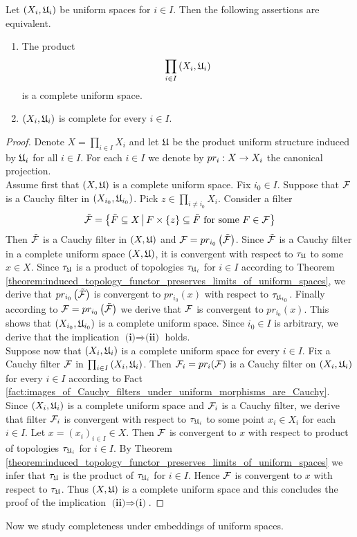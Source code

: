 \begin{theorem}\label{theorem:completeness_is_a_product_property}
Let $\left(X_i,{\mathfrak U}_i\right)$ be uniform spaces for $i \in I$. Then the following assertions are equivalent.
\begin{enumerate}[label=\emph{\textbf{(\roman*)}}, leftmargin=*]
\item The product
$$\prod_{i\in I}\left(X_i,{\mathfrak U}_i\right)$$
is a complete uniform space.
\item $\left(X_i,{\mathfrak U}_i\right)$ is complete for every $i\in I$.
\end{enumerate}
\end{theorem}
\begin{proof}
Denote $X = \prod_{i\in I}X_i$ and let ${\mathfrak U}$ be the product uniform structure induced by ${\mathfrak U}_i$ for all $i\in I$. For each $i\in I$ we denote by $pr_i:X\rightarrow X_i$ the canonical projection.\\
Assume first that $(X,{\mathfrak U})$ is a complete uniform space. Fix $i_0 \in I$. Suppose that ${\mathcal F}$ is a Cauchy filter in $(X_{i_0},{\mathfrak U}_{i_0})$. Pick $z \in \prod_{i\neq i_0}X_i$. Consider a filter 
$$\tilde{{\mathcal F}} = \big\{\tilde{F}\subseteq X\,\big|\,F\times \{z\} \subseteq \tilde{F}\mbox{ for some }F\in {\mathcal F}\big\}$$
Then $\tilde{{\mathcal F}}$ is a Cauchy filter in $(X,{\mathfrak U})$ and ${\mathcal F} = pr_{i_0}\left(\tilde{{\mathcal F}}\right)$. Since $\tilde{{\mathcal F}}$ is a Cauchy filter in a complete uniform space $(X,{\mathfrak U})$, it is convergent with respect to $\tau_{{\mathfrak U}}$ to some $x \in X$. Since $\tau_{{\mathfrak U}}$ is a product of topologies $\tau_{{\mathfrak U}_i}$ for $i \in I$ according to Theorem \ref{theorem:induced_topology_functor_preserves_limits_of_uniform_spaces}, we derive that $pr_{i_0}\left(\tilde{{\mathcal F}}\right)$ is convergent to $pr_{i_0}(x)$ with respect to $\tau_{{\mathfrak U}_{i_0}}$. Finally according to ${\mathcal F} = pr_{i_0}\left(\tilde{{\mathcal F}}\right)$ we derive that ${\mathcal F}$ is convergent to $pr_{i_0}(x)$. This shows that $(X_{i_0},{\mathfrak U}_{i_0})$ is a complete uniform space. Since $i_0 \in I$ is arbitrary, we derive that the implication $\textbf{(i)}\Rightarrow \textbf{(ii)}$ holds.
\\
Suppose now that $\left(X_i,{\mathfrak U}_i\right)$ is a complete uniform space for every $i\in I$. Fix a Cauchy filter ${\mathcal F}$ in $\prod_{i\in I}\left(X_i,{\mathfrak U}_i\right)$. Then ${\mathcal F}_i = pr_i({\mathcal F})$ is a Cauchy filter on $\left(X_i,{\mathfrak U}_i\right)$ for every $i\in I$ according to Fact \ref{fact:images_of_Cauchy_filters_under_uniform_morphisms_are_Cauchy}. Since $\left(X_i,{\mathfrak U}_i\right)$ is a complete uniform space and ${\mathcal F}_i$ is a Cauchy filter, we derive that filter ${\mathcal F}_i$ is convergent with respect to $\tau_{{\mathfrak U}_i}$ to some point $x_i \in X_i$ for each $i\in I$. Let $x = \left(x_i\right)_{i\in I}\in X$. Then ${\mathcal F}$ is convergent to $x$ with respect to product of topologies $\tau_{{\mathfrak U}_i}$ for $i\in I$. By Theorem \ref{theorem:induced_topology_functor_preserves_limits_of_uniform_spaces} we infer that $\tau_{{\mathfrak U}}$ is the product of $\tau_{{\mathfrak U}_i}$ for $i\in I$. Hence ${\mathcal F}$ is convergent to $x$ with respect to $\tau_{{\mathfrak U}}$. Thus $(X,{\mathfrak U})$ is a complete uniform space and this concludes the proof of the implication $\textbf{(ii)}\Rightarrow \textbf{(i)}$.
\end{proof}
\noindent
Now we study completeness under embeddings of uniform spaces.


